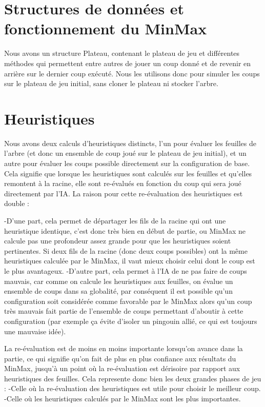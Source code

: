 \documentclass{report}
\begin{document}
\section{Structures de données et fonctionnement du MinMax}
Nous avons un structure Plateau, contenant le plateau de jeu et différentes méthodes qui permettent entre autres de jouer un coup donné et de revenir en arrière sur le dernier coup exécuté.
\newline
Nous les utilisons donc pour simuler les coups sur le plateau de jeu initial, sans cloner le plateau ni stocker l'arbre.



\section{Heuristiques}
Nous avons deux calculs d'heuristiques distincts, l'un pour évaluer les feuilles de l'arbre (et donc un ensemble de coup joué sur le plateau de jeu initial), et un autre pour évaluer les coups possible directement sur la configuration de base.
\newline 
Cela signifie que lorsque les heuristiques sont calculés sur les feuilles et qu'elles remontent à la racine, elle sont re-évalués en fonction du coup qui sera joué directement par l'IA.
\newline
La raison pour cette re-évaluation des heuristiques est double :

\hspace{0.5cm}	-D'une part, cela permet de départager les fils de la racine qui ont une heuristique identique, c'est donc très bien en début de partie, ou MinMax ne calcule pas une profondeur assez grande pour que les heuristiques soient pertinentes. \newline
Si deux fils de la racine (donc deux coups possibles) ont la même heuristiques calculée par le MinMax, il vaut mieux choisir celui dont le coup est le plus avantageux.
\hspace{0.5cm}	-D'autre part, cela permet à l'IA de ne pas faire de coups mauvais, car comme on calcule les heuristiques aux feuilles, on évalue un ensemble de coups dans sa globalité, par conséquent il est possible qu'un configuration soit considérée comme favorable par le MinMax alors qu'un coup très mauvais fait partie de l'ensemble de coups permettant d'aboutir à cette configuration (par exemple ça évite d'isoler un pingouin allié, ce qui est toujours une mauvaise idée).

\vspace{0.7cm}
La re-évaluation est de moins en moins importante lorsqu'on avance dans la partie, ce qui signifie qu'on fait de plus en plus confiance aux résultats du MinMax, jusqu'à un point où la re-évaluation est dérisoire par rapport aux heuristiques des feuilles.
\newline
Cela represente donc bien les deux grandes phases de jeu :
\newline
-Celle où la re-évaluation des heuristiques est utile pour choisir le meilleur coup.
-Celle où les heuristiques calculés par le MinMax sont les plus importantes.
\end{document}
